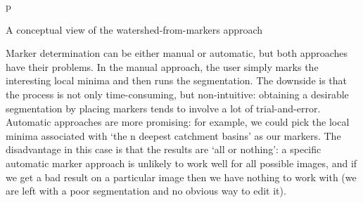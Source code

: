 \begin{stusubfig}{p}
	\hspace{4mm}%
	\hspace{4mm}%
\caption{A conceptual view of the watershed-from-markers approach}
\label{fig:segmentation-waterfall-watershedfrommarkers}
\end{stusubfig}

Marker determination can be either manual or automatic, but both approaches have their problems. In the manual approach, the user simply marks the interesting local minima and then runs the segmentation. The downside is that the process is not only time-consuming, but non-intuitive: obtaining a desirable segmentation by placing markers tends to involve a lot of trial-and-error. Automatic approaches are more promising: for example, we could pick the local minima associated with `the n deepest catchment basins' as our markers. The disadvantage in this case is that the results are `all or nothing': a specific automatic marker approach is unlikely to work well for all possible images, and if we get a bad result on a particular image then we have nothing to work with (we are left with a poor segmentation and no obvious way to edit it).

